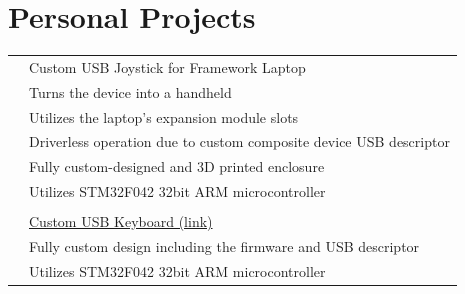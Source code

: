 \documentclass[lighthipster]{simplehipstercv}
\begin{document}
\begin{paracol}{2}
\begin{minipage}[t]{0.60\textwidth}
\begin{tabular}{@{}l c @{}r}
	\end{tabular}

	\bigskip
	\bigskip

	\section*{Personal Projects}
	\begin{tabular}{l @{}l}

		\\[-1mm]

		\icon{\faSquare}{Blue}{}
		& \hspace{1mm} Custom USB Joystick for Framework Laptop \\[1mm]

		\phantom{x}\tiny\phantom{xx}\faCircle
		& \hspace{2mm} Turns the device into a handheld \\[1mm]
		
		\phantom{x}\tiny\phantom{xx}\faCircle
		& \hspace{2mm} Utilizes the laptop's expansion module slots \\[1mm]
                
		\phantom{x}\tiny\phantom{xx}\faCircle
		& \hspace{2mm} Driverless operation due to custom composite 
							device USB descriptor \\[1mm]
		
		\phantom{x}\tiny\phantom{xx}\faCircle
		& \hspace{2mm} Fully custom-designed and 3D printed enclosure \\[1mm]
                
		\phantom{x}\tiny\phantom{xx}\faCircle
		& \hspace{2mm} Utilizes STM32F042 32bit ARM microcontroller \\[2mm]

		\\[1mm]


		\icon{\faSquare}{Blue}{}
		& \hspace{1mm} 
		\href{https://github.com/Xses-1/Keypad-keyboard-6-key-keyboard}
		{Custom USB Keyboard (link)} \\[1mm]

		\phantom{x}\tiny\phantom{xx}\faCircle
		& \hspace{2mm} Fully custom design including the firmware and USB descriptor \\[1mm]
		
		\phantom{x}\tiny\phantom{xx}\faCircle
		& \hspace{2mm} Utilizes STM32F042 32bit ARM microcontroller \\[2mm]


\end{tabular}
\end{minipage}
\end{paracol}
\end{document}

